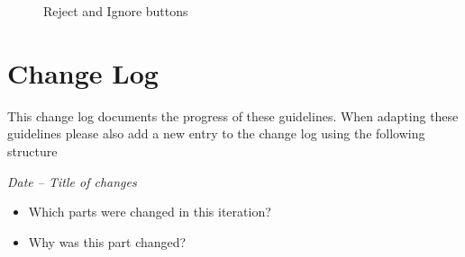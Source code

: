 \documentclass{article}
\begin{document}
\begin{figure}[H]
     \caption{Reject and Ignore buttons}
     \label{reject_ignore}
\end{figure}

\pagebreak
\section{Change Log}
This change log documents the progress of these guidelines. When adapting these guidelines please also add a new entry to the change log using the following structure
\begin{mdframed}[frametitle={Template}]
\emph{Date – Title of changes}
\begin{itemize}
	\item Which parts were changed in this iteration?
    \item Why was this part changed?
\end{itemize}
\end{mdframed}



\pagebreak

\listoffigures
\end{document}
